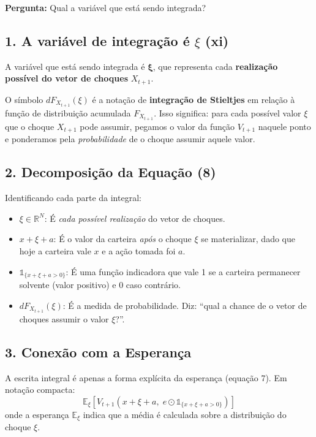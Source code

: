 \documentclass[12pt,a4paper]{article}
\begin{document}
\textbf{Pergunta:} Qual a variável que está sendo integrada?

\subsection{1. A variável de integração é \texorpdfstring{$\xi$}{xi} (xi)}

A variável que está sendo integrada é $\boldsymbol{\xi}$, que representa cada \textbf{realização possível do vetor de choques} $X_{t+1}$.

O símbolo $dF_{X_{t+1}}(\xi)$ é a notação de \textbf{integração de Stieltjes} em relação à função de distribuição acumulada $F_{X_{t+1}}$. Isso significa: para cada possível valor $\xi$ que o choque $X_{t+1}$ pode assumir, pegamos o valor da função $V_{t+1}$ naquele ponto e ponderamos pela \textit{probabilidade} de o choque assumir aquele valor.

\subsection{2. Decomposição da Equação (8)}

Identificando cada parte da integral:
\begin{itemize}
    \item \textbf{$\xi \in \mathbb{R}^N$}: É \textit{cada possível realização} do vetor de choques.
    \item \textbf{$x + \xi + a$}: É o valor da carteira \textit{após} o choque $\xi$ se materializar, dado que hoje a carteira vale $x$ e a ação tomada foi $a$.
    \item \textbf{$\mathbb{1}_{\{x+\xi+a>0\}}$}: É uma função indicadora que vale 1 se a carteira permanecer solvente (valor positivo) e 0 caso contrário.
    \item \textbf{$dF_{X_{t+1}}(\xi)$}: É a medida de probabilidade. Diz: ``qual a chance de o vetor de choques assumir o valor $\xi$?''.
\end{itemize}

\subsection{3. Conexão com a Esperança}

A escrita integral é apenas a forma explícita da esperança (equação 7). Em notação compacta:
\begin{equation}
    \mathbb{E}_\xi\!\left[V_{t+1}(x + \xi + a,\; e \odot \mathbb{1}_{\{x+\xi+a>0\}})\right]
\end{equation}
onde a esperança $\mathbb{E}_\xi$ indica que a média é calculada sobre a distribuição do choque $\xi$.
\end{document}
